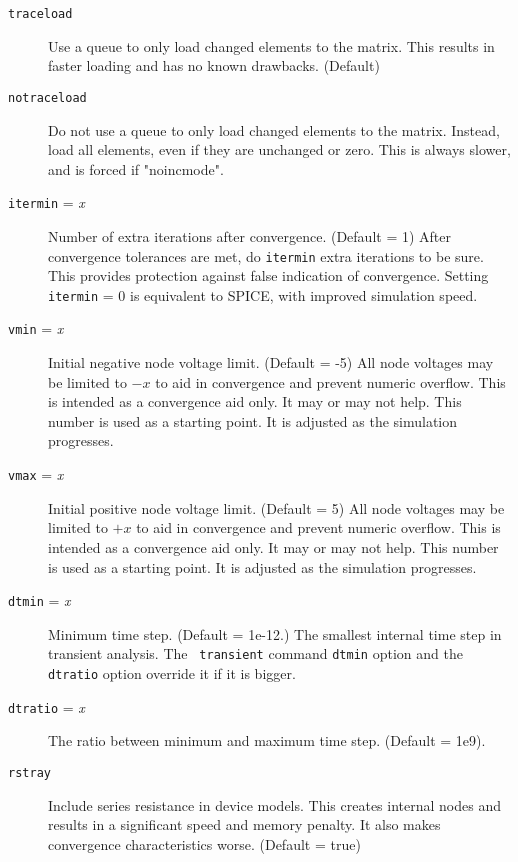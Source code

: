 \begin{description}
\item[{\tt traceload}] Use a queue to only load changed elements
to the matrix.  This results in faster loading and has no known
drawbacks.  (Default)

\item[{\tt notraceload}] Do not use a queue to only load changed
elements to the matrix.  Instead, load all elements, even if they
are unchanged or zero.  This is always slower, and is forced if
"noincmode".

\item[{\tt itermin} = {\it x}] 
Number of extra iterations after convergence. (Default = 1) After
convergence tolerances are met, do {\tt itermin} extra iterations to
be sure.  This provides protection against false indication of
convergence.  Setting {\tt itermin} = 0 is equivalent to SPICE, with
improved simulation speed.

\item[{\tt vmin} = {\it x}]
Initial negative node voltage limit.  (Default = -5) All node voltages
may be limited to $-x$ to aid in convergence and prevent numeric
overflow.  This is intended as a convergence aid only.  It may or may
not help.  This number is used as a starting point.  It is adjusted as
the simulation progresses.

\item[{\tt vmax} = {\it x}]
Initial positive node voltage limit.  (Default = 5) All node voltages
may be limited to $+x$ to aid in convergence and prevent numeric
overflow.  This is intended as a convergence aid only.  It may or may
not help.  This number is used as a starting point.  It is adjusted as
the simulation progresses.

\item[{\tt dtmin} = {\it x}] Minimum time step.  (Default = 1e-12.)
The smallest internal time step in transient analysis.  The {\tt
transient} command {\tt dtmin} option and the {\tt dtratio} option
override it if it is bigger.

\item[{\tt dtratio} = {\it x}] The ratio between minimum and maximum
time step.  (Default = 1e9).

\item[{\tt rstray}] Include series resistance in device models.  This 
creates internal nodes and results in a significant speed and memory
penalty.  It also makes convergence characteristics worse. (Default =
true)


\end{description}
